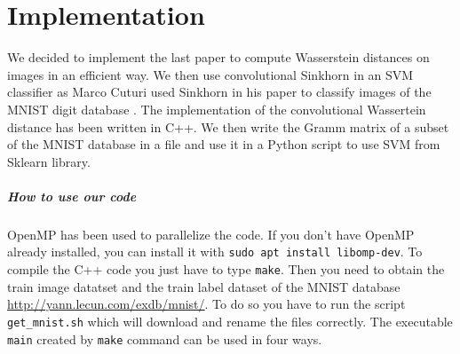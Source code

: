 \chapter{Implementation}

We decided to implement the last paper to compute Wasserstein distances
on images in an efficient way. We then use convolutional Sinkhorn in an SVM
classifier as Marco Cuturi used Sinkhorn in his paper to classify images of
the MNIST digit database \cite{Cut}. The implementation of the convolutional
Wassertein distance has been written in C++. We then write the Gramm matrix
of a subset of the MNIST database in a file and use it in a Python script
to use SVM from Sklearn library.

\paragraph{How to use our code}
OpenMP has been used to parallelize the code. If you don't have OpenMP already
installed, you can install it with \verb|sudo apt install libomp-dev|.
To compile the C++ code you just have to type \verb|make|. Then you need
to obtain the train image datatset and the train label dataset of the MNIST
database \url{http://yann.lecun.com/exdb/mnist/}. To do so you have to run
the script \verb|get_mnist.sh| which will download and rename the files
correctly. The executable \verb|main| created by \verb|make| command can be
used in four ways.

